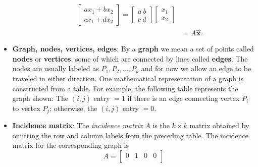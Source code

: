 \documentclass{report}
\begin{document}
\begin{itemize}
\begin{itemize}
\begin{align*}
\begin{bmatrix}
                                                                        ax_{1} + bx_{2} \\
                                                                        cx_{1} + dx_{2}
                                                                    \end{bmatrix} = \begin{bmatrix}
                                                                        a\ b \\
                                                                        c\ d
                                                                    \end{bmatrix} \begin{bmatrix}
                                                                        x_{1} \\ x_{2}
                                                                    \end{bmatrix} \\
                                                                    &= A\vec{\mathbf{x}}
                          .\end{align*}
                  \end{itemize}
              \item \textbf{Graph, nodes, vertices, edges}:
                  By a \textbf{graph} we mean a set of points called \textbf{nodes} or \textbf{vertices}, some of which are
                  connected by lines called \textbf{edges}. The nodes are usually labeled as $P_{1}, P_{2}, ..., P_{k} $ and for now we allow an edge to be traveled in either direction. One mathematical
                  representation of a graph is constructed from a table. For example, the following
                  table represents the graph shown:
                  \bigbreak \noindent 
                  \bigbreak \noindent 
                  The \( (i, j) \) entry \( = 1 \) if there is an edge connecting vertex \( P_i \) to vertex \( P_j \); otherwise, the \( (i, j) \) entry \( = 0 \). 
              \item \textbf{Incidence matrix}: The \textit{incidence matrix} \( A \) is the \( k \times k \) matrix obtained by omitting the row and column labels from the preceding table. The incidence matrix for the corresponding graph is
                  \[
                      A = \begin{bmatrix}
                          0 & 1 & 0 & 0 \\

\end{bmatrix}\]
\end{itemize}
\end{document}
